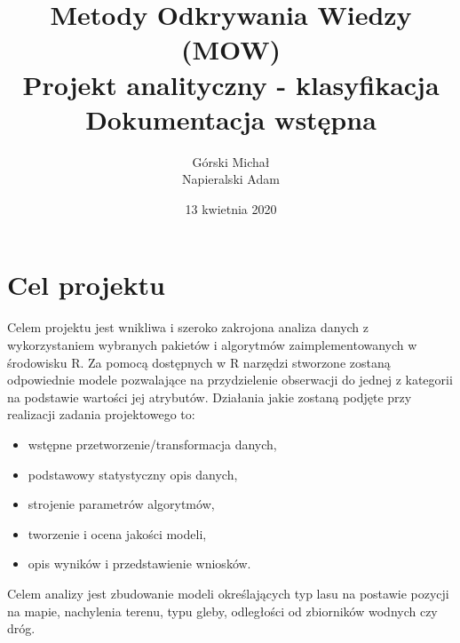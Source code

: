 \documentclass[a4paper,10pt]{article}
\title{Metody Odkrywania Wiedzy (MOW)\\Projekt analityczny - klasyfikacja\\Dokumentacja wstępna}
\author{Górski Michał\\Napieralski Adam}
\date{13 kwietnia 2020}
\begin{document}
	\maketitle
	
	\section{Cel projektu}
	Celem projektu jest wnikliwa i szeroko zakrojona analiza danych z wykorzystaniem wybranych pakietów i algorytmów zaimplementowanych w środowisku R. Za pomocą dostępnych w R narzędzi stworzone zostaną odpowiednie modele pozwalające na przydzielenie obserwacji do jednej z kategorii na podstawie wartości jej atrybutów. Działania jakie zostaną podjęte przy realizacji zadania projektowego to:
	\begin{itemize}
		\item wstępne przetworzenie/transformacja danych,
		\item podstawowy statystyczny opis danych,
		\item strojenie parametrów algorytmów,
		\item tworzenie i ocena jakości modeli,
		\item opis wyników i przedstawienie wniosków.
	\end{itemize}
 	Celem analizy jest zbudowanie modeli określających typ lasu na postawie pozycji na mapie, nachylenia terenu, typu gleby, odległości od zbiorników wodnych czy dróg.
\end{document}
